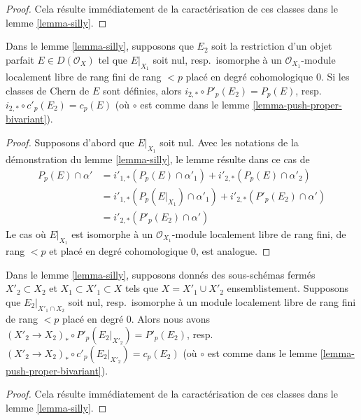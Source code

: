 \begin{proof}
Cela résulte immédiatement de la caractérisation de ces classes dans le
lemme \ref{lemma-silly}.
\end{proof}

\begin{lemma}
\label{lemma-silly-silly}
Dans le lemme \ref{lemma-silly}, supposons que $E_2$ soit la restriction d'un objet
parfait $E \in D(\mathcal{O}_X)$ tel que $E|_{X_1}$ soit nul,
resp.\ isomorphe à un $\mathcal{O}_{X_1}$-module localement libre de rang fini
de rang $< p$ placé en degré cohomologique $0$.
Si les classes de Chern de $E$ sont définies, alors
$i_{2, *} \circ P'_p(E_2) = P_p(E)$,
resp.\ $i_{2, *} \circ c'_p(E_2) = c_p(E)$
(où $\circ$ est comme dans le lemme \ref{lemma-push-proper-bivariant}).
\end{lemma}

\begin{proof}
Supposons d'abord que $E|_{X_1}$ soit nul.
Avec les notations de la démonstration du lemme \ref{lemma-silly},
le lemme résulte dans ce cas de
\begin{align*}
P_p(E) \cap \alpha'
& =
i'_{1, *}(P_p(E) \cap \alpha'_1) +
i'_{2, *}(P_p(E) \cap \alpha'_2) \\
& =
i'_{1, *}(P_p(E|_{X_1}) \cap \alpha'_1) +
i'_{2, *}(P'_p(E_2) \cap \alpha') \\
& =
i'_{2, *}(P'_p(E_2) \cap \alpha')
\end{align*}
Le cas où $E|_{X_1}$ est isomorphe à un
$\mathcal{O}_{X_1}$-module localement libre de rang fini, de rang $< p$ et placé en degré cohomologique $0$,
est analogue.
\end{proof}

\begin{lemma}
\label{lemma-silly-shrink}
Dans le lemme \ref{lemma-silly}, supposons donnés des sous-schémas fermés
$X'_2 \subset X_2$ et $X_1 \subset X'_1 \subset X$ tels que
$X = X'_1 \cup X'_2$ ensemblistement. Supposons que $E_2|_{X'_1 \cap X_2}$
soit nul, resp.\ isomorphe à un module localement libre de rang fini
de rang $< p$ placé en degré $0$. Alors nous avons
$(X'_2 \to X_2)_* \circ P'_p(E_2|_{X'_2}) = P'_p(E_2)$,
resp.\  $(X'_2 \to X_2)_* \circ c'_p(E_2|_{X'_2}) = c_p(E_2)$
(où $\circ$ est comme dans le lemme \ref{lemma-push-proper-bivariant}).
\end{lemma}

\begin{proof}
Cela résulte immédiatement de la caractérisation de ces classes
dans le lemme \ref{lemma-silly}.
\end{proof}

